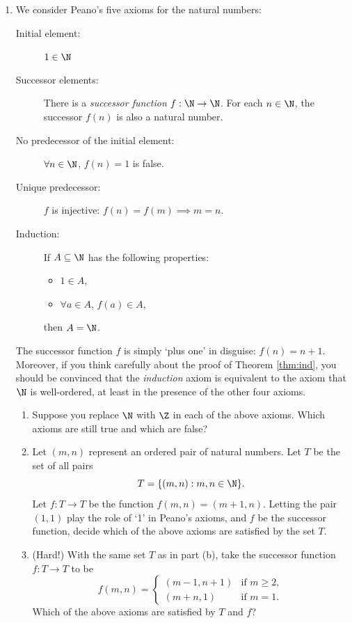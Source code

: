 \begin{enumerate}
  \item We consider Peano's five axioms for the natural numbers:
	\begin{description}
		\item[Initial element:]\quad $1\in\N$
		\item[Successor elements:]\quad There is a \emph{successor function} $f:\N\to\N$. For each $n\in\N$, the successor $f(n)$ is also a natural number.
		\item[No predecessor of the initial element:]\quad $\forall n\in\N$, $f(n)=1$ is false.
		\item[Unique predecessor:]\quad $f$ is injective: $f(n)=f(m)\implies m=n$.
		\item[Induction:]\quad If $A\subseteq\N$ has the following properties:
		\begin{itemize}
			\item $1\in A$,
			\item $\forall a\in A$, $f(a)\in A$,
		\end{itemize}
		then $A=\N$.
	\end{description}
	The successor function $f$ is simply `plus one' in disguise: $f(n)=n+1$. Moreover, if you think carefully about the proof of Theorem \ref{thm:ind}, you should be convinced that the \emph{induction} axiom is equivalent to the axiom that $\N$ is well-ordered, at least in the presence of the other four axioms.
	\begin{enumerate}
		\item Suppose you replace $\N$ with $\Z$ in each of the above axioms. Which axioms are still true and which are false?
		\item Let $(m,n)$ represent an ordered pair of natural numbers. Let $T$ be the set of all pairs
		\[T=\{(m,n):m,n\in\N\}.\]
		Let $f:T\to T$ be the function $f(m,n)=(m+1,n)$. Letting the pair $(1,1)$ play the role of `1' in Peano's axioms, and $f$ be the successor function, decide which of the above axioms are satisfied by the set $T$.
		\item (Hard!) With the same set $T$ as in part (b), take the successor function $f:T\to T$ to be
		\[f(m,n)=\begin{cases}
		(m-1,n+1)&\text{if }m\ge 2,\\
		(m+n,1)&\text{if }m=1.
		\end{cases}\]
		Which of the above axioms are satisfied by $T$ and $f$?
	\end{enumerate}
	

\end{enumerate}
